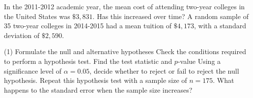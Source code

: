 \documentclass[../mathNotesPreamble]{subfiles}
\begin{document}
  \begin{ex*}
    In the 2011-2012 academic year, the mean cost of attending two-year colleges in the United States was $\$3,831$. Has this increased over time? A random sample of 35 two-year colleges in 2014-2015 had a mean tuition of $\$4,173$, with a standard deviation of $\$2,590$.
  \end{ex*}
  \begin{extasks}[after-item-skip=\stretch{1}](1)
    \task Formulate the null and alternative hypotheses
    \task Check the conditions required to perform a hypothesis test.
    \task Find the test statistic and $p$-value
    \task Using a significance level of $\alpha=0.05$, decide whether to reject or fail to reject the null hypothesis.
    \task Repeat this hypothesis test with a sample size of $n=175$. What happens to the standard error when the sample size increases?
  \end{extasks}

  \pagebreak
\end{document}
